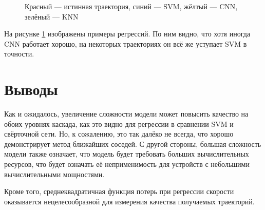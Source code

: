 \documentclass[12pt,twoside]{article}
\begin{document}
\begin{figure}
    \caption{Красный --- истинная траектория, синий --- SVM, жёлтый --- CNN, зелёный --- KNN}
    \label{im:traj}
\end{figure}

На рисунке \ref{im:traj} изображены примеры регрессий. По ним видно, что хотя иногда CNN работает хорошо, на некоторых траекториях он всё же уступает SVM в точности.

\section{Выводы}

Как и ожидалось, увеличение сложности модели может повысить качество на обоих уровнях каскада, как это видно для регрессии в сравнении SVM и свёрточной сети. Но, к сожалению, это так далёко не всегда, что хорошо демонстрирует метод ближайших соседей. С другой стороны, большая сложность модели также означает, что модель будет требовать больших вычислительных ресурсов, что будет означать её неприменимость для устройств с небольшими вычислительными мощностями.

Кроме того, среднеквадратичная функция потерь при регрессии скорости оказывается нецелесообразной для измерения качества получаемых траекторий.

\nocite{*}


\end{document}
